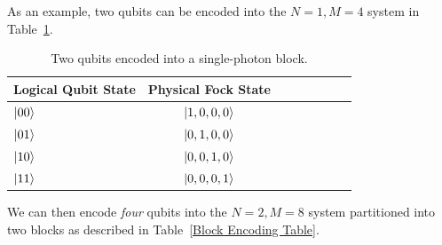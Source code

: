 \documentclass[aps,pra,twocolumn,showpacs,superscriptaddress,floatfix,10pt]{revtex4}
\begin{document}
As an example, two qubits can be encoded into the $N=1,M=4$ system in Table~\ref{Two Qubit Encoding Table}.
\begin {table}[h]
\begin{center}
	\begin{tabular}{l*{6}{c}r} 
		Logical Qubit State      \quad \quad \quad     & Physical Fock State \\
		\hline 
		\quad \quad \quad $\ket{00}$     & $\ket{1,0,0,0}$ \\
		\quad \quad \quad $\ket{01}$            & $\ket{0,1,0,0}$ \\
		\quad \quad \quad $\ket{10}$            & $\ket{0,0,1,0}$ \\
		\quad \quad \quad $\ket{11}$            & $\ket{0,0,0,1}$ \\
	\end{tabular}
	\caption{ \label{Two Qubit Encoding Table} Two qubits encoded into a single-photon block.}
\end{center}
\end{table}
We can then encode \textit{four} qubits into the $N=2,M=8$ system partitioned into two blocks as described in Table~\ref{Block Encoding Table}.
\end{document}
